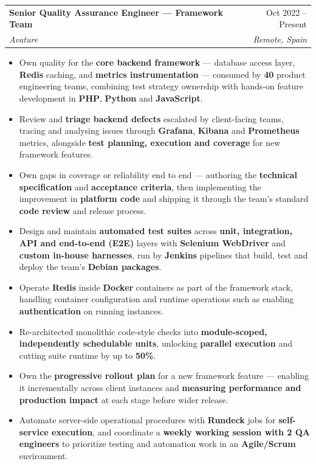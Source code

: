 \documentclass[letterpaper,11pt]{article}
\makeatletter
\newcommand{\resumeItem}[1]{
  \item\small{
    {#1 \vspace{-2pt}}
  }
}
\newcommand{\resumeSubheading}[4]{
  \vspace{-2pt}\item
    \begin{tabular*}{0.97\textwidth}[t]{l@{\extracolsep{\fill}}r}
      \textbf{#1} & #2 \\
      \textit{\small#3} & \textit{\small #4} \\
    \end{tabular*}\vspace{-7pt}
}
\newcommand{\resumeItemListStart}{\begin{itemize}}
\newcommand{\resumeItemListEnd}{\end{itemize}\vspace{-5pt}}
\makeatother
\begin{document}
    \resumeSubheading
      {Senior Quality Assurance Engineer — Framework Team}{Oct 2022 -- Present}
      {Avature}{Remote, Spain}
      \resumeItemListStart
        \resumeItem{Own quality for the \textbf{core backend framework} — database access layer,
          \textbf{Redis} caching, and \textbf{metrics instrumentation} — consumed by \textbf{40}
          product engineering teams, combining test strategy ownership with hands-on feature
          development in \textbf{PHP}, \textbf{Python} and \textbf{JavaScript}.}
        \resumeItem{Review and \textbf{triage backend defects} escalated by client-facing teams,
          tracing and analysing issues through \textbf{Grafana}, \textbf{Kibana} and
          \textbf{Prometheus} metrics, alongside \textbf{test planning, execution and coverage} for
          new framework features.}
        \resumeItem{Own gaps in coverage or reliability end to end --- authoring the
          \textbf{technical specification} and \textbf{acceptance criteria}, then implementing the
          improvement in \textbf{platform code} and shipping it through the team's standard
          \textbf{code review} and release process.}
        \resumeItem{Design and maintain \textbf{automated test suites} across \textbf{unit, integration,
          API and end-to-end (E2E)} layers with \textbf{Selenium WebDriver} and \textbf{custom in-house
          harnesses}, run by \textbf{Jenkins} pipelines that build, test and deploy the team's
          \textbf{Debian packages}.}
        \resumeItem{Operate \textbf{Redis} inside \textbf{Docker} containers as part of the framework
          stack, handling container configuration and runtime operations such as enabling
          \textbf{authentication} on running instances.}
        \resumeItem{Re-architected monolithic code-style checks into \textbf{module-scoped,
          independently schedulable units}, unlocking \textbf{parallel execution} and cutting suite
          runtime by up to \textbf{50\%}.}
        \resumeItem{Own the \textbf{progressive rollout plan} for a new framework feature — enabling it
          incrementally across client instances and \textbf{measuring performance and production impact}
          at each stage before wider release.}
        \resumeItem{Automate server-side operational procedures with \textbf{Rundeck} jobs for
          \textbf{self-service execution}, and coordinate a \textbf{weekly working session with 2 QA
          engineers} to prioritize testing and automation work in an \textbf{Agile/Scrum} environment.}
      \resumeItemListEnd
\end{document}
